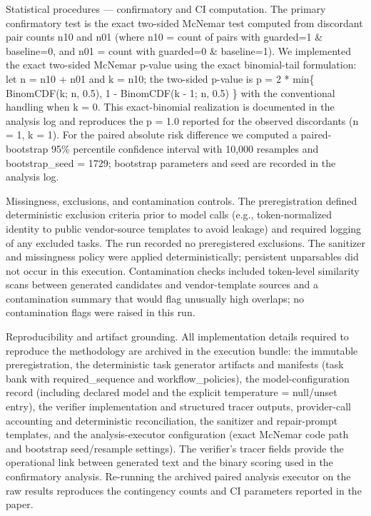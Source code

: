 \documentclass[conference]{IEEEtran}
\begin{document}
Statistical procedures --- confirmatory and CI computation. The primary confirmatory test is the exact two-sided McNemar test computed from discordant pair counts n10 and n01 (where n10 = count of pairs with guarded=1 \& baseline=0, and n01 = count with guarded=0 \& baseline=1). We implemented the exact two-sided McNemar p-value using the exact binomial-tail formulation: let n = n10 + n01 and k = n10; the two-sided p-value is p = 2 * min\{ BinomCDF(k; n, 0.5), 1 - BinomCDF(k - 1; n, 0.5) \} with the conventional handling when k = 0. This exact-binomial realization is documented in the analysis log and reproduces the p = 1.0 reported for the observed discordants (n = 1, k = 1). For the paired absolute risk difference we computed a paired-bootstrap 95\% percentile confidence interval with 10,000 resamples and bootstrap\_seed = 1729; bootstrap parameters and seed are recorded in the analysis log.

Missingness, exclusions, and contamination controls. The preregistration defined deterministic exclusion criteria prior to model calls (e.g., token-normalized identity to public vendor-source templates to avoid leakage) and required logging of any excluded tasks. The run recorded no preregistered exclusions. The sanitizer and missingness policy were applied deterministically; persistent unparsables did not occur in this execution. Contamination checks included token-level similarity scans between generated candidates and vendor-template sources and a contamination summary that would flag unusually high overlaps; no contamination flags were raised in this run.

Reproducibility and artifact grounding. All implementation details required to reproduce the methodology are archived in the execution bundle: the immutable preregistration, the deterministic task generator artifacts and manifests (task bank with required\_sequence and workflow\_policies), the model-configuration record (including declared model and the explicit temperature = null/unset entry), the verifier implementation and structured tracer outputs, provider-call accounting and deterministic reconciliation, the sanitizer and repair-prompt templates, and the analysis-executor configuration (exact McNemar code path and bootstrap seed/resample settings). The verifier's tracer fields provide the operational link between generated text and the binary scoring used in the confirmatory analysis. Re-running the archived paired analysis executor on the raw results reproduces the contingency counts and CI parameters reported in the paper.
\end{document}
